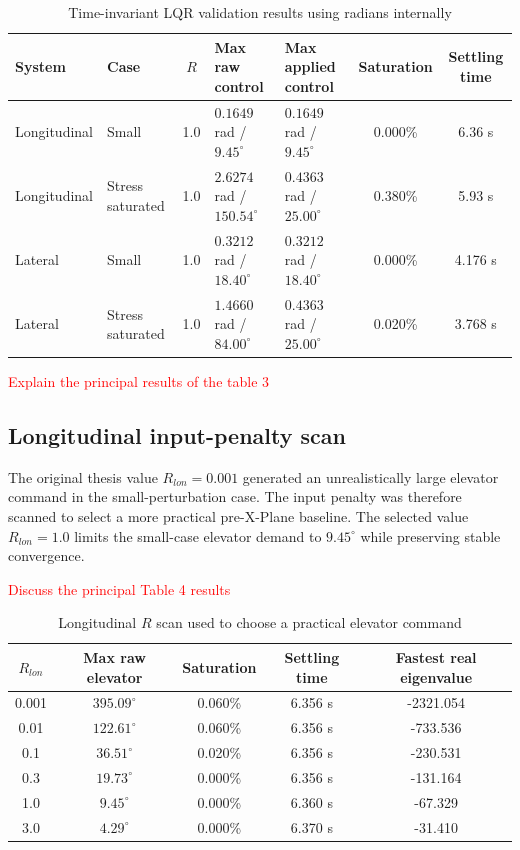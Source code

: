 \documentclass[10pt]{article}
\begin{document}
\begin{table}[H]
\centering
\caption{Time-invariant LQR validation results using radians internally}
\label{tab:validation_results}
\small
\begin{tabularx}{\textwidth}{l l c X X c c}
\toprule
System & Case & $R$ & Max raw control & Max applied control & Saturation & Settling time \\
\midrule
Longitudinal & Small & 1.0 & $0.1649$ rad / $9.45^\circ$ & $0.1649$ rad / $9.45^\circ$ & 0.000\% & 6.36 s \\
Longitudinal & Stress saturated & 1.0 & $2.6274$ rad / $150.54^\circ$ & $0.4363$ rad / $25.00^\circ$ & 0.380\% & 5.93 s \\
Lateral & Small & 1.0 & $0.3212$ rad / $18.40^\circ$ & $0.3212$ rad / $18.40^\circ$ & 0.000\% & 4.176 s \\
Lateral & Stress saturated & 1.0 & $1.4660$ rad / $84.00^\circ$ & $0.4363$ rad / $25.00^\circ$ & 0.020\% & 3.768 s \\
\bottomrule
\end{tabularx}
\end{table}
\textcolor{red}{Explain the principal results of the table 3}


\subsection{Longitudinal input-penalty scan}

The original thesis value $R_{lon}=0.001$ generated an unrealistically large elevator command in the small-perturbation case. The input penalty was therefore scanned to select a more practical pre-X-Plane baseline. The selected value $R_{lon}=1.0$ limits the small-case elevator demand to $9.45^\circ$ while preserving stable convergence.

\textcolor{red}{Discuss the principal Table 4 results }

\begin{table}[H]
\centering
\caption{Longitudinal $R$ scan used to choose a practical elevator command}
\label{tab:rscan}
\small
\begin{tabular}{c c c c c}
\toprule
$R_{lon}$ & Max raw elevator & Saturation & Settling time & Fastest real eigenvalue \\
\midrule
0.001 & $395.09^\circ$ & 0.060\% & 6.356 s & -2321.054 \\
0.01  & $122.61^\circ$ & 0.060\% & 6.356 s & -733.536 \\
0.1   & $36.51^\circ$  & 0.020\% & 6.356 s & -230.531 \\
0.3   & $19.73^\circ$  & 0.000\% & 6.356 s & -131.164 \\
1.0   & $9.45^\circ$   & 0.000\% & 6.360 s & -67.329 \\
3.0   & $4.29^\circ$   & 0.000\% & 6.370 s & -31.410 \\
\bottomrule
\end{tabular}
\end{table}
\end{document}
